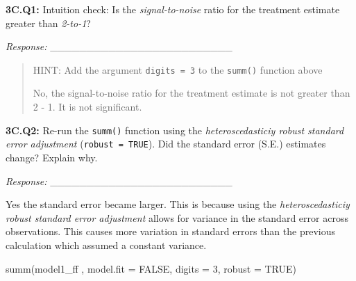 \documentclass[
  letterpaper,
  DIV=11,
  numbers=noendperiod]{scrartcl}
\newenvironment{Shaded}{\begin{snugshade}}{\end{snugshade}}
\newcommand{\AttributeTok}[1]{\textcolor[rgb]{0.40,0.45,0.13}{#1}}
\newcommand{\ConstantTok}[1]{\textcolor[rgb]{0.56,0.35,0.01}{#1}}
\newcommand{\DecValTok}[1]{\textcolor[rgb]{0.68,0.00,0.00}{#1}}
\newcommand{\FunctionTok}[1]{\textcolor[rgb]{0.28,0.35,0.67}{#1}}
\newcommand{\NormalTok}[1]{\textcolor[rgb]{0.00,0.23,0.31}{#1}}
\begin{document}
\textbf{3C.Q1:} Intuition check: Is the \emph{signal-to-noise} ratio for
the treatment estimate greater than \emph{2-to-1}?

\emph{Response:} \_\_\_\_\_\_\_\_\_\_\_\_\_\_\_\_\_\_\_\_\_\_\_\_\_

\begin{quote}
HINT: Add the argument \texttt{digits\ =\ 3} to the \texttt{summ()}
function above

No, the signal-to-noise ratio for the treatment estimate is not greater
than 2 - 1. It is not significant.
\end{quote}

\textbf{3C.Q2:} Re-run the \texttt{summ()} function using the
\emph{heteroscedasticiy robust standard error adjustment}
(\texttt{robust\ =\ TRUE}). Did the standard error (S.E.) estimates
change? Explain why.

\emph{Response:} \_\_\_\_\_\_\_\_\_\_\_\_\_\_\_\_\_\_\_\_\_\_\_\_\_

Yes the standard error became larger. This is because using the
\emph{heteroscedasticiy robust standard error adjustment} allows for
variance in the standard error across observations. This causes more
variation in standard errors than the previous calculation which assumed
a constant variance.

\begin{Shaded}
\begin{Highlighting}[]
\FunctionTok{summ}\NormalTok{(model1\_ff , }\AttributeTok{model.fit =} \ConstantTok{FALSE}\NormalTok{, }\AttributeTok{digits =} \DecValTok{3}\NormalTok{, }\AttributeTok{robust =} \ConstantTok{TRUE}\NormalTok{)}
\end{Highlighting}
\end{Shaded}
\end{document}
